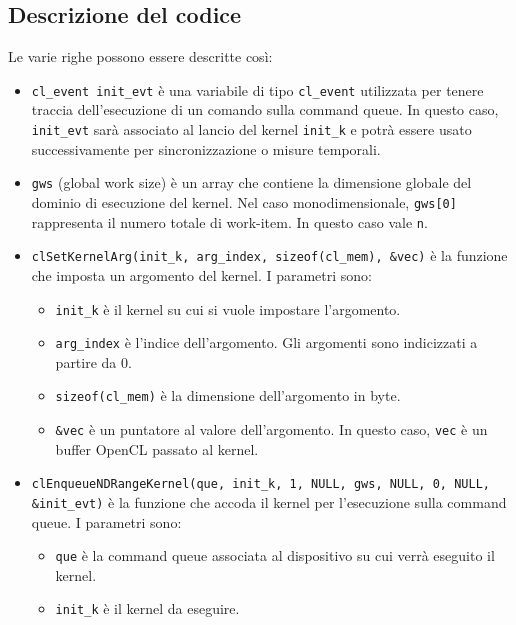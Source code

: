 \subsection*{Descrizione del codice}
Le varie righe possono essere descritte così:
\begin{itemize}
    \item \texttt{cl\_event init\_evt} è una variabile di tipo \texttt{cl\_event} utilizzata per tenere traccia dell'esecuzione di un comando sulla command queue. In questo caso, \texttt{init\_evt} sarà associato al lancio del kernel \texttt{init\_k} e potrà essere usato successivamente per sincronizzazione o misure temporali.
    
    \item \texttt{gws} (global work size) è un array che contiene la dimensione globale del dominio di esecuzione del kernel. Nel caso monodimensionale, \texttt{gws[0]} rappresenta il numero totale di work-item. In questo caso vale \texttt{n}.
    
    \item \texttt{clSetKernelArg(init\_k, arg\_index, sizeof(cl\_mem), \&vec)} è la funzione che imposta un argomento del kernel. I parametri sono:
    \begin{itemize}
        \item \texttt{init\_k} è il kernel su cui si vuole impostare l'argomento.
        
        \item \texttt{arg\_index} è l'indice dell'argomento. Gli argomenti sono indicizzati a partire da 0.
        
        \item \texttt{sizeof(cl\_mem)} è la dimensione dell'argomento in byte.
        
        \item \texttt{\&vec} è un puntatore al valore dell'argomento. In questo caso, \texttt{vec} è un buffer OpenCL passato al kernel.
    \end{itemize}
    
    \item \texttt{clEnqueueNDRangeKernel(que, init\_k, 1, NULL, gws, NULL, 0, NULL, \&init\_evt)} è la funzione che accoda il kernel per l'esecuzione sulla command queue. I parametri sono:
    \begin{itemize}
        \item \texttt{que} è la command queue associata al dispositivo su cui verrà eseguito il kernel.
        
        \item \texttt{init\_k} è il kernel da eseguire.
        

\end{itemize}
\end{itemize}

